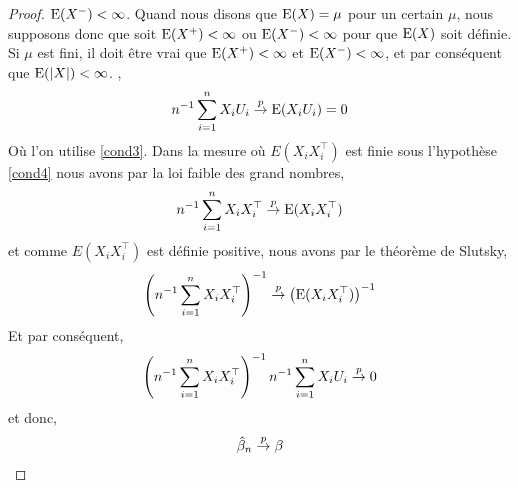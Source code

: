 \begin{proof}
{$\operatorname{E}(X^{-}) <\infty$. Quand nous disons que $\operatorname{E}(X) = \mu$ pour un certain $\mu$, nous supposons donc que  soit
$\operatorname{E}(X^{+}) <\infty$ ou $\operatorname{E}(X^{-}) <\infty$ pour que $\operatorname{E}(X)$ soit définie.
Si $\mu$ est fini, il doit être vrai que $\operatorname{E}(X^{+}) < \infty$ et $\operatorname{E}(X^{-}) <\infty$, et
par conséquent que $\operatorname{E}(\left\vert {X} \right\vert) < \infty$.
},
\begin{align*}
n^{-1} \sum_{i=1}^n X_iU_i \overset{p}{\rightarrow} \operatorname{E}(X_iU_i) = 0
\end{align*}
Où l'on utilise \ref{cond3}. Dans la mesure où $E(X_iX_i^\top)$ est finie sous l'hypothèse \ref{cond4} nous avons par la loi faible des grand nombres,
\begin{align*}
n^{-1} \sum_{i=1}^n X_iX_i^\top \overset{p}{\rightarrow} \operatorname{E}(X_iX_i^\top)
\end{align*}
et comme  $E(X_iX_i^\top)$ est définie positive, nous avons  par le théorème de Slutsky,
\begin{align}
\left(n^{-1} \sum_{i=1}^n X_iX_i^\top\right)^{-1} \overset{p}{\rightarrow} \left(\operatorname{E}(X_iX_i^\top)\right)^{-1}
\label{eq2}
\end{align}
Et par conséquent,
\begin{align*}
\left(n^{-1}\sum_{i=1}^n X_iX_i^\top\right)^{-1}n^{-1}\sum_{i=1}^n X_iU_i \overset{p}{\rightarrow} 0
\end{align*}
et donc,
\begin{align*}
\hat{\beta}_n\overset{p}{\rightarrow} \beta
\end{align*}
\end{proof}

